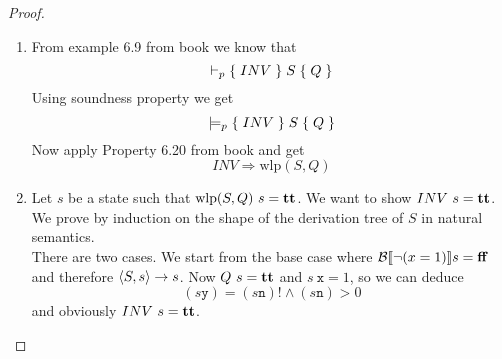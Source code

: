 \begin{proof}
	\begin{enumerate}
		\item From example 6.9 from book we know that
		\begin{equation*}
		\vdash_p {\{\;INV\;\}\;S\;\{\;Q\;\}}
		\end{equation*}
		Using soundness property we get
		\begin{equation*}
		\models_p {\{\;INV\;\}\;S\;\{\;Q\;\}}
		\end{equation*}
		Now apply Property 6.20 from book and get
		\begin{equation*}
		INV\Rightarrow\mathrm{wlp}(S,Q)
		\end{equation*}
		\item Let $s$ be a state such that $\mathrm{wlp}(S,Q)\ s=\true$. We want to show $INV\ s=\true$. We prove by induction on the shape of the derivation tree of $S$ in natural semantics.\\
		
		There are two cases. We start from the base case where $\mathcal{B}[\![\neg(x=1)]\!] s=\textbf{ff}$ and therefore $\left<S,s\right> \rightarrow s$. Now $Q\ s=\textbf{tt}$ and $s\ \mathtt{x}=1$, so we can deduce
		\begin{equation*}
		(s \mathtt{y})=(s \mathtt{n})!\land (s \mathtt{n})>0
		\end{equation*}
		and obviously $INV\ s=\true$.\\
		

\end{enumerate}
\end{proof}
